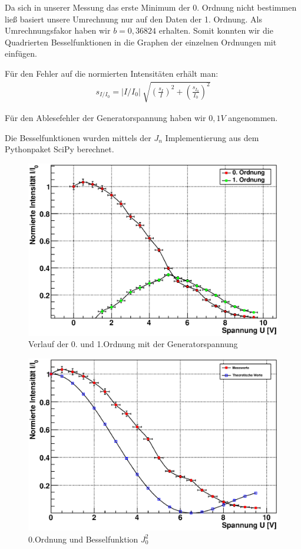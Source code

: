 \documentclass[12pt]{article}
\begin{document}
Da sich in unserer Messung das erste Minimum der 0. Ordnung nicht bestimmen ließ basiert unsere Umrechnung nur auf den Daten der 1. Ordnung.
Als Umrechnungsfakor haben wir $b = 0,36824$ erhalten. Somit konnten wir die Quadrierten Besselfunktionen in die Graphen der einzelnen Ordnungen mit 
einfügen.

Für den Fehler auf die normierten Intensitäten erhält man:
\begin{align}
 s_{I/I_0} = \lvert I/I_0 \rvert ~ \sqrt{\left(\frac{s_I}{I}\right)^2 + \left(\frac{s_{I_0}}{I_0}\right)^2}
\end{align}

Für den Ablesefehler der Generatorspannung haben wir $0,1V$ angenommen.

Die Besselfunktionen wurden mittels der $J_n$ Implementierung aus dem Pythonpaket SciPy berechnet.

\begin{figure}[H]  
\centering
\includegraphics[width=0.9\linewidth]{pictures/raman0+1o.eps}
\caption{Verlauf der 0. und 1.Ordnung mit der Generatorspannung}
\end{figure}

\begin{figure}[H]  
\centering
\includegraphics[width=0.9\linewidth]{pictures/raman0o.eps}
\caption{0.Ordnung und Besselfunktion $J^2_0$}
\end{figure}
\end{document}
